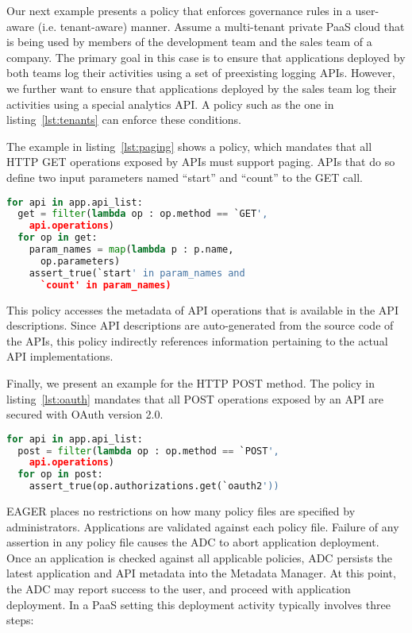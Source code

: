 Our next example presents a policy that enforces governance 
rules in a user-aware (i.e. tenant-aware) manner. Assume
a multi-tenant private PaaS cloud that is being 
used by members of the development
team and the sales team of a company. The primary goal in this case
is to ensure that applications deployed by both teams
log their activities using a set of preexisting logging APIs. 
However, we further want to ensure that applications
deployed by the sales team log their activities using 
a special analytics API. A policy such as the one
in listing~\ref{lst:tenants} can enforce these conditions.

The example in listing~\ref{lst:paging} shows a policy, which mandates 
that all HTTP GET operations exposed by APIs must support
paging. APIs that do so define two input parameters 
named ``start'' and ``count'' to the GET call.

{\footnotesize
\begin{lstlisting}[language=Python, frame=single, showstringspaces=false, 
caption={Enforcement of paging functionality in APIs.}, label={lst:paging}]
for api in app.api_list:
  get = filter(lambda op : op.method == `GET',  
    api.operations)
  for op in get:
    param_names = map(lambda p : p.name, 
      op.parameters)
    assert_true(`start' in param_names and 
      `count' in param_names)
\end{lstlisting}
}

This policy accesses the metadata of API operations that 
is available in the API descriptions.
Since API descriptions are auto-generated 
from the source code of the APIs, this policy indirectly
references information pertaining to the actual API implementations.

Finally, we present an example for the HTTP POST method.  The 
policy in listing~\ref{lst:oauth} mandates 
that all POST operations exposed by an API are secured 
with OAuth version 2.0.

{\footnotesize
\begin{lstlisting}[language=Python, frame=single, showstringspaces=false, 
caption={Enforcement of OAuth-based authentication for APIs.}, label={lst:oauth}]
for api in app.api_list:
  post = filter(lambda op : op.method == `POST', 
  	api.operations)
  for op in post:
    assert_true(op.authorizations.get(`oauth2'))
\end{lstlisting}
}

EAGER places no restrictions on how many policy files are specified by 
administrators. Applications are validated against each policy file. Failure
of any assertion in any policy file causes the ADC to abort 
application deployment. Once an application is checked against all
applicable policies, ADC persists the latest application and API metadata into
the Metadata Manager.  At this point, the ADC may report success to the user,
and proceed with application deployment. In a PaaS setting
this deployment activity typically involves three steps:

